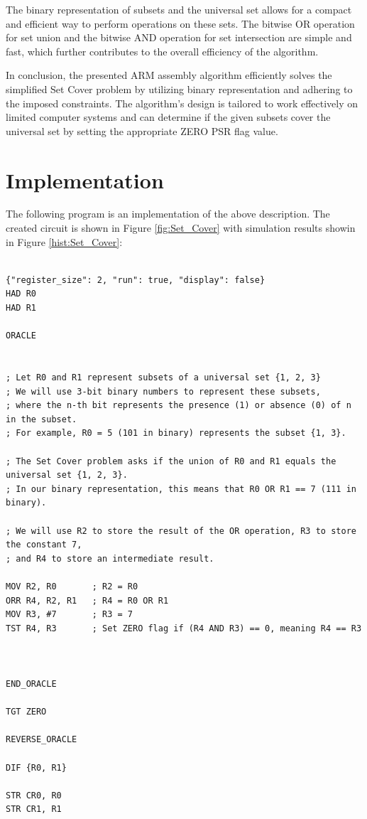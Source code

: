 The binary representation of subsets and the universal set allows for a compact and efficient way to perform operations on these sets. The bitwise OR operation for set union and the bitwise AND operation for set intersection are simple and fast, which further contributes to the overall efficiency of the algorithm.

In conclusion, the presented ARM assembly algorithm efficiently solves the simplified Set Cover problem by utilizing binary representation and adhering to the imposed constraints. The algorithm's design is tailored to work effectively on limited computer systems and can determine if the given subsets cover the universal set by setting the appropriate ZERO PSR flag value.



\section{Implementation}

The following program is an implementation of the above description. The created circuit is shown in Figure \ref{fig:Set_Cover} with simulation results showin in Figure \ref{hist:Set_Cover}:

\begin{lstlisting}

{"register_size": 2, "run": true, "display": false}
HAD R0
HAD R1

ORACLE


; Let R0 and R1 represent subsets of a universal set {1, 2, 3}
; We will use 3-bit binary numbers to represent these subsets,
; where the n-th bit represents the presence (1) or absence (0) of n in the subset.
; For example, R0 = 5 (101 in binary) represents the subset {1, 3}.

; The Set Cover problem asks if the union of R0 and R1 equals the universal set {1, 2, 3}.
; In our binary representation, this means that R0 OR R1 == 7 (111 in binary).

; We will use R2 to store the result of the OR operation, R3 to store the constant 7,
; and R4 to store an intermediate result.

MOV R2, R0       ; R2 = R0
ORR R4, R2, R1   ; R4 = R0 OR R1
MOV R3, #7       ; R3 = 7
TST R4, R3       ; Set ZERO flag if (R4 AND R3) == 0, meaning R4 == R3



END_ORACLE

TGT ZERO

REVERSE_ORACLE

DIF {R0, R1}

STR CR0, R0
STR CR1, R1


\end{lstlisting}

